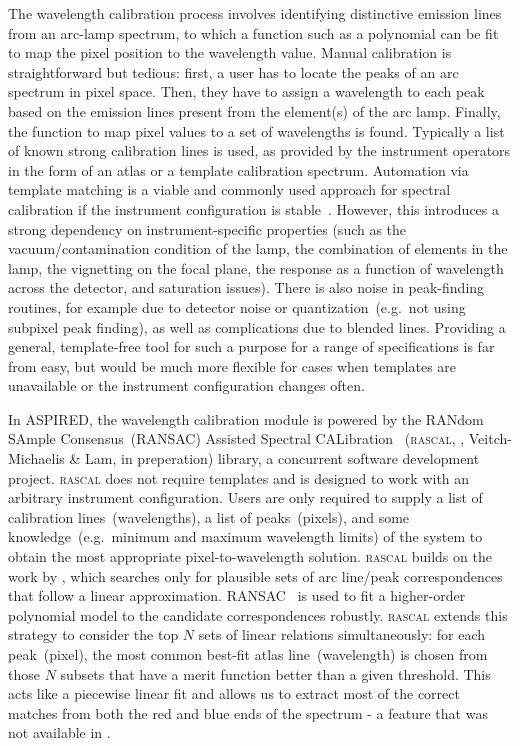 \documentclass[linenumbers, twocolumn]{aastex631}
\begin{document}
The wavelength calibration process involves identifying distinctive emission
lines from an arc-lamp spectrum, to which a function such as a polynomial can be
fit to map the pixel position to the wavelength value. Manual calibration is
straightforward but tedious: first, a user has to locate the peaks of an arc
spectrum in pixel space. Then, they have to assign a wavelength to each peak
based on the emission lines present from the element(s) of the arc lamp.
Finally, the function to map pixel values to a set of wavelengths is found.
Typically a list of known strong calibration lines is used, as provided by the
instrument operators in the form of an atlas or a template calibration spectrum.
Automation via template matching is a viable and commonly used approach for
spectral calibration if the instrument configuration is
stable~\citep{2020JOSS....5.2308P}. However, this introduces a strong
dependency on instrument-specific properties (such as the
vacuum/contamination condition of the lamp, the combination of elements in the
lamp, the vignetting on the focal plane, the response as a function of wavelength
across the detector, and saturation issues). There is also noise in peak-finding
routines, for example due to detector noise or quantization~(e.g.\ not using
subpixel peak finding), as well as complications due to blended lines.
Providing a general, template-free tool for such a purpose for a range of
specifications is far from easy, but would be much more flexible for cases when
templates are unavailable or the instrument configuration changes often.

In \textsc{ASPIRED}, the wavelength calibration module is powered by the
RANdom SAmple Consensus~(RANSAC) Assisted Spectral CALibration ~(\textsc{rascal},
\citealt{2020zndo...4117517V, 2020ASPC..527..627V}, Veitch-Michaelis \& Lam, in preperation)
library, a concurrent software development project.
\textsc{rascal} does not require templates and is designed to
work with an arbitrary instrument configuration. Users are only
required to supply a list of calibration
lines~(wavelengths), a list of peaks~(pixels), and some knowledge~(e.g.\ minimum
and maximum wavelength limits) of the system to obtain the most appropriate
pixel-to-wavelength solution. \textsc{rascal} builds on the work by \citet{2018ApOpt..57.6876S}, which
searches only for plausible sets of arc line/peak correspondences
that follow a linear approximation. RANSAC~\citep{fischler_bolles_1981}
is used to fit a higher-order polynomial model to the candidate correspondences
robustly. \textsc{rascal} extends this strategy to consider the top $N$ sets
of linear relations simultaneously: for each peak~(pixel), the most common
best-fit atlas line~(wavelength) is chosen from those $N$ subsets that have
a merit function better than a given threshold. This acts like a piecewise
linear fit and allows us to extract most of the correct matches from both the
red and blue ends of the spectrum - a feature that was
not available in \citet{2018ApOpt..57.6876S}.
\end{document}

